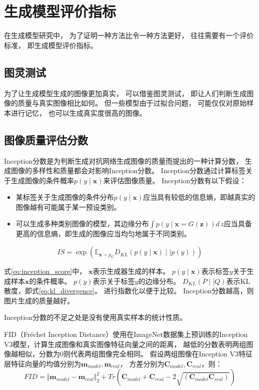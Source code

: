 \section{生成模型评价指标}
在生成模型研究中，
为了证明一种方法比令一种方法更好，
往往需要有一个评价标准，
即生成模型评价指标。
\subsection{图灵测试}
为了让生成模型生成的图像更加真实，
可以借鉴图灵测试，
即让人们判断生成图像的质量与真实图像相比如何。
但一些模型由于过拟合问题，
可能仅仅对原始样本进行记忆，
也可以生成真实度很高的图像。 




\subsection{图像质量评估分数}

Inception分数{ {\cite{salimans2016improved}}}是为判断生成对抗网络生成图像的质量而提出的一种计算分数，
生成图像的多样性和质量都会对影响Inception分数。
Inception分数通过计算标签关于生成图像的条件概率{$p(y\mid \bm{x})$}来评估图像质量。
Inception分数有以下假设：
\begin{itemize}
    \item 某标签关于生成图像的条件分布{$p(y\mid \bm{x})$}应当具有较低的信息熵，即越真实的图像越有可能属于某一预设类别。
    \item 可以生成多种类别图像的模型，其边缘分布{$\int p(y\mid \bm{x}= G(\bm{z}))d\,z$}应当具备更高的信息熵，即生成的图像应当均匀地属于不同类别。
\end{itemize}
\begin{equation}
    \label{eq:inception_score}
    IS= \exp{(\mathbb{E}_{\bm{x} \sim p_{G}} D_{KL}(p(y\mid \bm{x})\mid \mid p(y)))}
\end{equation}

式{\ref{eq:inception_score}}中，
{$\bm{x}$}表示生成器生成的样本。
{$p(y\mid \bm{x})$}表示标签{$y$}关于生成样本{$\bm{x}$}的条件概率。
{$p(y)$}表示关于标签{$y$}的边缘分布。
{$D_{KL}(P\mid\mid Q)$}表示KL散度，即式{\ref{eq:kl_divergence}}。
进行指数化以便于比较。
Inception分数越高，则图片生成的质量越好。

Inception分数的不足之处是没有使用真实样本的统计性质。

FID{ {\cite{heusel2017gans}}}（Fréchet Inception Distance）使用在ImageNet数据集上预训练的Inception V3模型，计算生成图像和真实图像特征向量之间的距离，
越低的分数表明两组图像越相似，分数为0则代表两组图像完全相同。
假设两组图像在Inception V3特征层特征向量的均值分别为{$\bm{m}_{model},\bm{m}_{real}$}，
方差分别为{$\bm{C}_{model},\bm{C}_{real}$}，则：
\begin{equation}
    \label{eq:fid_score}
    FID=\Vert \bm{m}_{model}-\bm{m}_{real}  \Vert_2^2 +Tr(\bm{C}_{model}+\bm{C}_{real}-2\sqrt{(\bm{C}_{model}\bm{C}_{real})} )
\end{equation}

